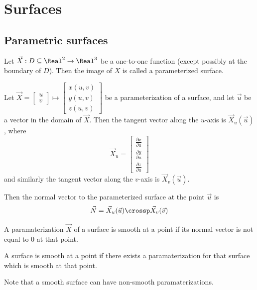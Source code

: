 \section{Surfaces}

\subsection{Parametric surfaces}

\begin{definition}
  Let $\vec{X} : D \subseteq \Real^2 \to \Real^3$ be a one-to-one function (except possibly at the boundary of $D$). Then the image of $X$ is called a parameterized surface.
\end{definition}

\begin{definition}
  Let $\vec{X} = \begin{bmatrix}
    u \\
    v
  \end{bmatrix} \mapsto \begin{bmatrix}
    x(u, v) \\
    y(u, v) \\
    z(u, v)
  \end{bmatrix}$ be a parameterization of a surface, and let $\vec{u}$ be a vector in the domain of $\vec{X}$. Then the tangent vector along the $u$-axis is $\vec{X}_u(\vec{u})$, where
  \[
    \vec{X}_u = \begin{bmatrix}
      \frac{\partial x}{\partial u} \\
      \frac{\partial y}{\partial u} \\
      \frac{\partial z}{\partial u}
    \end{bmatrix}
  \]
  and similarly the tangent vector along the $v$-axis is $\vec{X}_v(\vec{u})$.

  Then the normal vector to the parameterized surface at the point $\vec{u}$ is
  \[
    \vec{N} = \vec{X}_u (\vec{u}) \crossp \vec{X}_v (\vec{v})
  \]
\end{definition}

\begin{definition}[Smooth]
  A paramaterization $\vec{X}$ of a surface is smooth at a point if its normal vector is not equal to 0 at that point.

  A surface is smooth at a point if there exists a paramaterization for that surface which is smooth at that point.

  Note that a smooth surface can have non-smooth paramaterizations.
\end{definition}

